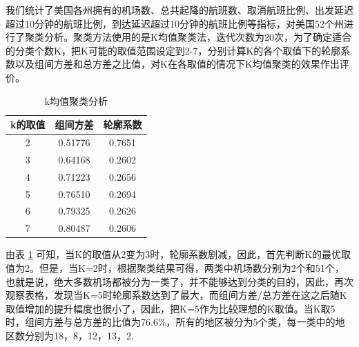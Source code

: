 \documentclass[12pt,a4paper,onecolumn]{article}
\begin{document}
我们统计了美国各州拥有的机场数、总共起降的航班数、取消航班比例、出发延迟超过10分钟的航班比例，到达延迟超过10分钟的航班比例等指标，对美国52个州进行了聚类分析。聚类方法使用的是K均值聚类法，迭代次数为20次，为了确定适合的分类个数K，把K可能的取值范围设定到2-7，分别计算K的各个取值下的轮廓系数以及组间方差和总方差之比值，对K在各取值的情况下K均值聚类的效果作出评价。

\begin{table}[H]
	\centering
	\caption{k均值聚类分析}
	\begin{tabular}{ccc}
		\hline
		  k的取值 & 组间方差 & 轮廓系数  \\\hline
	     2 & 0.51776 & 0.7651  \\
		   3 & 0.64168 & 0.2602   \\
       4 & 0.71223 & 0.2656   \\
       5 & 0.76510 & 0.2694   \\
       6 & 0.79325 & 0.2626   \\
       7 & 0.80487 & 0.2606   \\\hline
	\end{tabular}
	\label{k均值}
\end{table}

由表 \ref{k均值} 可知，当K的取值从2变为3时，轮廓系数剧减，因此，首先判断K的最优取值为2。但是，当K=2时，根据聚类结果可得，两类中机场数分别为2个和51个，也就是说，绝大多数机场都被分为一类了，并不能够达到分类的目的，因此，再次观察表格，发现当K=5时轮廓系数达到了最大，而组间方差/总方差在这之后随K取值增加的提升幅度也很小了，因此，把K=5作为比较理想的K取值。当K取5时，组间方差与总方差的比值为76.6\%，所有的地区被分为5个类，每一类中的地区数分别为18，8，12，13，2.
\end{document}
